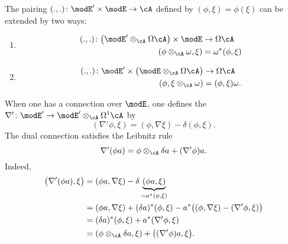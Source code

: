 The pairing $(.,.)\colon \modE'\times\modE\to \cA$ defined by $(\phi,\xi)=\phi(\xi)$ can be extended by two ways:
\begin{enumerate}
	\item
	      \begin{equation}
		      \begin{aligned}
			      (.,.)\colon \big( \modE'\otimes_{\cA}\Omega\cA \big)\times\modE & \to \Omega\cA       \\
			      (\phi\otimes_{\cA}\omega,\xi)                                   & =\omega^*(\phi,\xi)
		      \end{aligned}
	      \end{equation}
	\item
	      \begin{equation}
		      \begin{aligned}
			      (.,.)\colon \modE'\times\big( \modE\otimes_{\cA}\Omega\cA \big) & \to \Omega\cA      \\
			      (\phi,\xi\otimes_{\cA}\omega)                                   & =(\phi,\xi)\omega.
		      \end{aligned}
	      \end{equation}
\end{enumerate}
When one has a connection over $\modE$, one defines the  $\nabla'\colon \modE'\to \modE'\otimes_{\cA}\Omega^1\cA$ by
\begin{equation}
	(\nabla'\phi,\xi)=(\phi,\nabla\xi)-\delta(\phi,\xi).
\end{equation}
The dual connection satisfies the Leibnitz rule
\begin{equation}
	\nabla'(\phi a)=\phi\otimes_{\cA}\delta a+(\nabla'\phi)a.
\end{equation}
Indeed,
\begin{align*}
	\big( \nabla'(\phi a),\xi \big) & =(\phi a,\nabla\xi)-\delta\underbrace{(\phi a,\xi)}_{=a^*(\phi,\xi)}                         \\
	                                & =(\phi a,\nabla\xi)+(\delta a)^*(\phi,\xi)-a^*\big( (\phi,\nabla\xi)-(\nabla'\phi,\xi) \big) \\
	                                & =(\delta a)^*(\phi,\xi)+a^*(\nabla'\phi,\xi)                                                 \\
	                                & =(\phi\otimes_{\cA}\delta a,\xi)+\big( (\nabla'\phi)a,\xi \big).
\end{align*}

